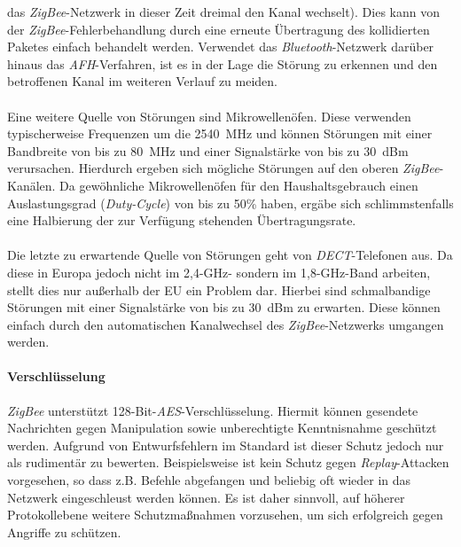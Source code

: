                 das \emph{ZigBee}-Netzwerk in dieser Zeit dreimal den Kanal wechselt). Dies kann von der \emph{ZigBee}-Fehlerbehandlung
                durch eine erneute Übertragung des kollidierten Paketes einfach behandelt werden. Verwendet
                das \emph{Bluetooth}-Netzwerk darüber hinaus das \emph{AFH}-Verfahren, ist es in der Lage die Störung zu
                erkennen und den betroffenen Kanal im weiteren Verlauf zu meiden.\\
                \\
                Eine weitere Quelle von Störungen sind Mikrowellenöfen. Diese verwenden typischerweise
                Frequenzen um die 2540~MHz und können Störungen mit einer Bandbreite von bis zu 80~MHz und einer Signalstärke
                von bis zu 30~dBm verursachen. Hierdurch ergeben sich mögliche Störungen auf den
                oberen \emph{ZigBee}-Kanälen. Da gewöhnliche Mikrowellenöfen für den Haushaltsgebrauch einen 
                Auslastungsgrad (\emph{Duty-Cycle}) von bis zu 50\% haben, ergäbe sich schlimmstenfalls eine Halbierung der
                zur Verfügung stehenden Übertragungsrate.\cite{ZigBeeFarahani}\\
                \\
                Die letzte zu erwartende Quelle von Störungen geht von \emph{DECT}-Telefonen aus. Da diese in Europa
                jedoch nicht im 2,4-GHz- sondern im 1,8-GHz-Band arbeiten, stellt dies nur außerhalb der EU ein
                Problem dar. Hierbei sind schmalbandige Störungen mit einer Signalstärke von bis zu 30~dBm 
                zu erwarten. Diese können einfach durch den automatischen Kanalwechsel des \emph{ZigBee}-Netzwerks
                umgangen werden.\\

            \paragraph{Verschlüsselung}\label{ZigBee Sicherheit}
                \emph{ZigBee} unterstützt 128-Bit-\emph{AES}-Verschlüsselung. Hiermit können gesendete Nachrichten 
                gegen Manipulation sowie unberechtigte Kenntnisnahme geschützt werden. Aufgrund von Entwurfsfehlern 
                im Standard ist dieser Schutz jedoch nur als rudimentär zu bewerten. Beispielsweise ist
                kein Schutz gegen \emph{Replay}-Attacken vorgesehen, so dass z.B. Befehle abgefangen und beliebig oft
                wieder in das Netzwerk eingeschleust werden können. Es ist daher sinnvoll, auf höherer 
                Pro\-to\-koll\-ebene weitere Schutzmaßnahmen vorzusehen, um sich erfolgreich gegen Angriffe zu
                schützen.

